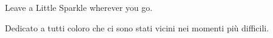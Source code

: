 \cleardoublepage
{}
\thispagestyle{empty}

\vspace*{3cm}

\begin{center}
    Leave a Little Sparkle wherever you go. \\ \medskip
\end{center}

\medskip

\begin{center}
    Dedicato a tutti coloro che ci sono stati vicini nei momenti più difficili.
\end{center}

